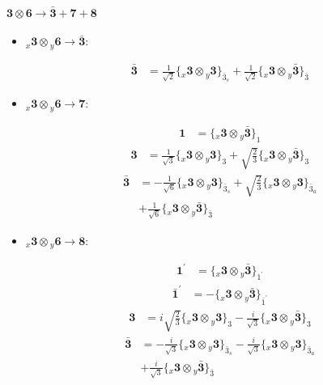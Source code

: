 \documentclass[english]{article}
\newcommand{\cgEqFontsize}{\large}
\newcommand{\rep}[1]{\mathbf{#1}}
\newcommand{\repx}[2]{{}_{#2}\mathbf{#1}}
\newcommand{\tsprod}[2]{\rep{#1}\otimes\rep{#2}}
\newcommand{\tsprodx}[2]{\repx{#1}{x}\otimes\repx{#2}{y}}
\newcommand{\subcgt}[3]{\big\{ \tsprodx{#1}{#2}\big\}^{}_{#3}}
\newcommand{\bfl}{\begin{fleqn}[25pt]}
\newcommand{\efl}{\end{fleqn}}
\begin{document}
\paragraph*{\cgEqFontsize $\tsprod{3}{6}\to\rep{\bar{3}}+\rep{7}+\rep{8}$}
\begin{itemize}
\item $\tsprodx{3}{6}\to\rep{\bar{3}}$:
\bfl
\begin{align*}
\rep{\bar{3}} & = \frac{1}{\sqrt{2}}\subcgt{3}{3}{\bar{3}_{s}}+\frac{1}{\sqrt{2}}\subcgt{3}{\bar{3}}{\bar{3}}
\end{align*}
\efl
\item $\tsprodx{3}{6}\to\rep{7}$:
\bfl
\begin{align*}
\rep{1} & = \subcgt{3}{\bar{3}}{1}
\end{align*}
\begin{align*}
\rep{3} & = \frac{1}{\sqrt{3}}\subcgt{3}{3}{3}+\sqrt{\frac{2}{3}}\subcgt{3}{\bar{3}}{3}
\end{align*}
\begin{align*}
\rep{\bar{3}} & = -\frac{1}{\sqrt{6}}\subcgt{3}{3}{\bar{3}_{s}}+\sqrt{\frac{2}{3}}\subcgt{3}{3}{\bar{3}_{a}} \\ 
 & +\frac{1}{\sqrt{6}}\subcgt{3}{\bar{3}}{\bar{3}}
\end{align*}
\efl
\item $\tsprodx{3}{6}\to\rep{8}$:
\bfl
\begin{align*}
\rep{1^{\prime}} & = \subcgt{3}{\bar{3}}{1^{\prime}}
\end{align*}
\begin{align*}
\rep{\bar{1}^{\prime}} & = -\subcgt{3}{\bar{3}}{\bar{1}^{\prime}}
\end{align*}
\begin{align*}
\rep{3} & = i \sqrt{\frac{2}{3}}\subcgt{3}{3}{3}-\frac{i}{\sqrt{3}}\subcgt{3}{\bar{3}}{3}
\end{align*}
\begin{align*}
\rep{\bar{3}} & = -\frac{i}{\sqrt{3}}\subcgt{3}{3}{\bar{3}_{s}}-\frac{i}{\sqrt{3}}\subcgt{3}{3}{\bar{3}_{a}} \\ 
 & +\frac{i}{\sqrt{3}}\subcgt{3}{\bar{3}}{\bar{3}}
\end{align*}
\efl
\end{itemize}
\end{document}
